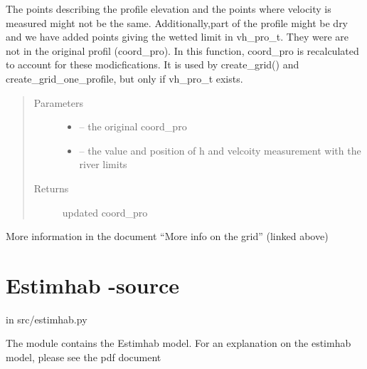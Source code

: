 \documentclass[letterpaper,10pt,english]{sphinxmanual}
\begin{document}

\begin{fulllineitems}
\label{\detokenize{index:src.manage_grid_8.update_coord_pro_with_vh_pro}}
The points describing the profile elevation and the points where velocity is measured might not be the same.
Additionally,part of the profile might be dry and we have added points giving the wetted limit in vh\_pro\_t. They were
are not in the original profil (coord\_pro). In this function,
coord\_pro is recalculated to account for these modicfications. It is used by create\_grid() and
create\_grid\_one\_profile, but only if vh\_pro\_t exists.
\begin{quote}\begin{description}
\item[{Parameters}] \leavevmode\begin{itemize}
\item {} 
 -- the original coord\_pro

\item {} 
 -- the value and position of h and velcoity measurement with the river limits

\end{itemize}

\item[{Returns}] \leavevmode
updated coord\_pro

\end{description}\end{quote}

More information in the document ``More info on the grid'' (linked above)

\end{fulllineitems}



\section{Estimhab -source}
\label{\detokenize{index:estimhab-source}}
in src/estimhab.py

The module contains the Estimhab model. For an explanation on the estimhab model, please see
the pdf document 
\label{\detokenize{index:module-src.estimhab}}
\end{document}

